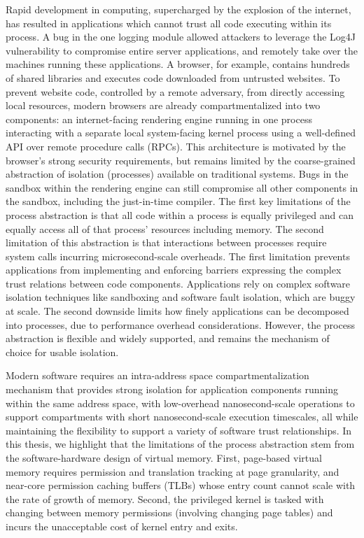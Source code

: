 Rapid development in computing, supercharged by the explosion of the internet,
has resulted in applications which cannot trust all code executing within
its process.
A bug in the one logging module allowed attackers to leverage the Log4J
vulnerability to compromise entire server applications, 
and remotely take over the machines running these applications.
A browser, for example, contains hundreds of shared libraries and executes
code downloaded from untrusted websites.
To prevent website code, controlled by a remote adversary, from directly 
accessing local resources, modern browsers are already compartmentalized into
two components: 
an internet-facing rendering engine running in one process 
interacting with 
a separate local system-facing kernel process
using a well-defined API over remote procedure calls (RPCs).
This architecture is motivated by the browser's strong security requirements,
but remains limited by the coarse-grained abstraction of isolation (processes)
available on traditional systems.
Bugs in the sandbox within the rendering engine can still compromise all
other components in the sandbox, including the just-in-time compiler.
The first key limitations of the process abstraction is that
all code within a process is equally privileged and 
can equally access all of that process' resources including memory.
The second limitation of this abstraction is that interactions between 
processes require system calls incurring microsecond-scale overheads.
The first limitation prevents applications from implementing and enforcing 
barriers expressing the complex trust relations between code components.
Applications rely on complex software isolation techniques like 
sandboxing and software fault isolation,
which are buggy at scale.
The second downside limits how finely applications can be decomposed into
processes, due to performance overhead considerations.
However, the process abstraction is flexible and widely supported, 
and remains the mechanism of choice for usable isolation.

Modern software requires an intra-address space compartmentalization mechanism
that provides strong isolation for application components
running within the same address space, with
low-overhead nanosecond-scale operations to support compartments with short
nanosecond-scale execution timescales, all while maintaining the flexibility
to support a variety of software trust relationships.
In this thesis, we highlight that the limitations of the process abstraction
stem from the software-hardware design of virtual memory.
First, page-based virtual memory requires permission and translation tracking
at page granularity, and near-core permission caching buffers (TLBs) whose
entry count cannot scale with the rate of growth of memory.
Second, the privileged kernel is tasked with changing between memory 
permissions (involving changing page tables) and incurs the unacceptable
cost of kernel entry and exits.

